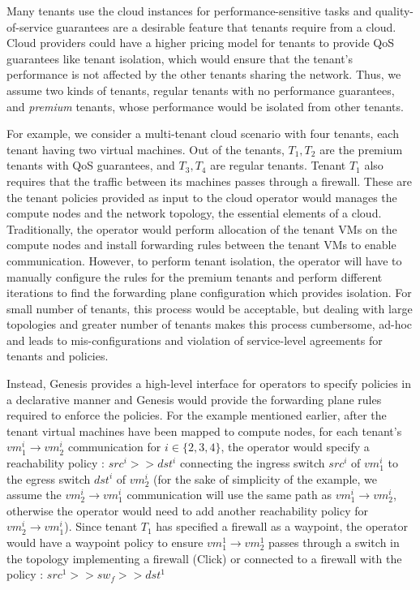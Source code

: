\documentclass[]{sig}
\begin{document}
Many tenants use the cloud instances for performance-sensitive tasks and quality-of-service guarantees are a desirable feature that tenants require from a cloud. Cloud providers could have a higher pricing model for tenants to provide QoS guarantees like tenant isolation, which would ensure that the tenant's performance is not affected by the other tenants sharing the network. Thus, we assume two kinds of tenants, regular tenants with no performance guarantees, and \emph{premium} tenants, whose performance would be isolated from other tenants. 

For example, we consider a multi-tenant cloud scenario with four tenants, each tenant having two virtual machines. Out of the tenants, $T_1, T_2$ are the premium tenants with QoS guarantees, and $T_3, T_4$ are regular tenants. Tenant $T_1$ also requires that the traffic between its machines passes through a firewall. These are the tenant policies provided as input to the cloud operator would manages the compute nodes and the network topology, the essential elements of a cloud. Traditionally, the operator would perform allocation of the tenant VMs on the compute nodes and install forwarding rules between the tenant VMs to enable communication. However, to perform tenant isolation, the operator will have to manually configure the rules for the premium tenants and perform different iterations to find the forwarding plane configuration which provides isolation. For small number of tenants, this process would be acceptable, but dealing with large topologies and greater number of tenants makes this process cumbersome, ad-hoc and leads to mis-configurations and violation of service-level agreements for tenants and policies. 

Instead, Genesis provides a high-level interface for operators to specify policies in a declarative manner and Genesis would provide the forwarding plane rules required to enforce the policies. For the example mentioned earlier, after the tenant virtual machines have been mapped to compute nodes, for each tenant's $vm_1^i \rightarrow vm_2^i$ communication for $i \in \{2,3,4\}$, the operator would specify a reachability policy : $src^i >> dst^i$ connecting the ingress switch $src^i$ of $vm^i_1$ to the egress switch $dst^i$ of $vm_2^i$ (for the sake of simplicity of the example, we assume the $vm_2^i \rightarrow vm_1^i$ communication will use the same path as $vm_1^i \rightarrow vm_2^i$, otherwise the operator would need to add another reachability policy for $vm_2^i \rightarrow vm_1^i$). Since tenant $T_1$ has specified a firewall as a waypoint, the operator would have a waypoint policy to ensure $vm^1_1 \rightarrow vm^1_2$ passes through a switch in the topology implementing a firewall (Click) or connected to a firewall with the policy : $src^1 >> sw_f >> dst^1$
\end{document}
